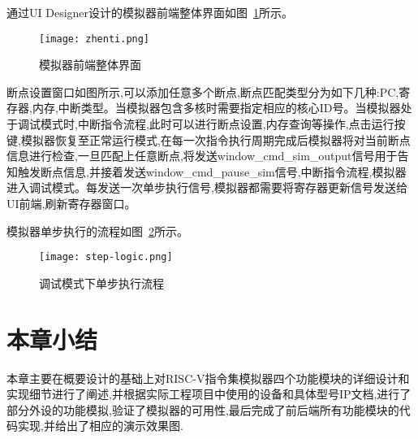         
通过UI Designer设计的模拟器前端整体界面如图~\ref{fig:zhenti}所示。
\begin{figure}[h]
    \centering
    \texttt{[image: zhenti.png]}
    \caption{模拟器前端整体界面}
    \label{fig:zhenti}
\end{figure}


断点设置窗口如图所示,可以添加任意多个断点,断点匹配类型分为如下几种:PC,寄存器,内存,中断类型。当模拟器包含多核时需要指定相应的核心ID号。当模拟器处于调试模式时,中断指令流程,此时可以进行断点设置,内存查询等操作,点击运行按键,模拟器恢复至正常运行模式,在每一次指令执行周期完成后模拟器将对当前断点信息进行检查,一旦匹配上任意断点,将发送window\_cmd\_sim\_output信号用于告知触发断点信息,并接着发送window\_cmd\_pause\_sim信号,中断指令流程,模拟器进入调试模式。每发送一次单步执行信号,模拟器都需要将寄存器更新信号发送给UI前端,刷新寄存器窗口。


模拟器单步执行的流程如图~\ref{fig:step}所示。
\begin{figure}[H]
    \centering
    \texttt{[image: step-logic.png]}
    \caption{调试模式下单步执行流程}
    \label{fig:step}
\end{figure}


\section{本章小结}
本章主要在概要设计的基础上对RISC-V指令集模拟器四个功能模块的详细设计和实现细节进行了阐述,并根据实际工程项目中使用的设备和具体型号IP文档,进行了部分外设的功能模拟,验证了模拟器的可用性,最后完成了前后端所有功能模块的代码实现,并给出了相应的演示效果图.


